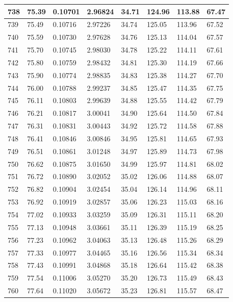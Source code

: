 \documentclass[12pt,a4paper,twoside]{article}
\begin{document}
\begin{center}
\begin{longtable}{l l l l | l l l l}
738 & 75.39 & 0.10701 & 2.96824 & 34.71 & 124.96 & 113.88 & 67.47 \\ \hline
739 & 75.49 & 0.10716 & 2.97226 & 34.74 & 125.05 & 113.96 & 67.52 \\ \hline
740 & 75.59 & 0.10730 & 2.97628 & 34.76 & 125.13 & 114.04 & 67.57 \\ \hline
741 & 75.70 & 0.10745 & 2.98030 & 34.78 & 125.22 & 114.11 & 67.61 \\ \hline
742 & 75.80 & 0.10759 & 2.98432 & 34.81 & 125.30 & 114.19 & 67.66 \\ \hline
743 & 75.90 & 0.10774 & 2.98835 & 34.83 & 125.38 & 114.27 & 67.70 \\ \hline
744 & 76.00 & 0.10788 & 2.99237 & 34.85 & 125.47 & 114.35 & 67.75 \\ \hline
745 & 76.11 & 0.10803 & 2.99639 & 34.88 & 125.55 & 114.42 & 67.79 \\ \hline
746 & 76.21 & 0.10817 & 3.00041 & 34.90 & 125.64 & 114.50 & 67.84 \\ \hline
747 & 76.31 & 0.10831 & 3.00443 & 34.92 & 125.72 & 114.58 & 67.88 \\ \hline
748 & 76.41 & 0.10846 & 3.00846 & 34.95 & 125.81 & 114.65 & 67.93 \\ \hline
749 & 76.51 & 0.10861 & 3.01248 & 34.97 & 125.89 & 114.73 & 67.98 \\ \hline
750 & 76.62 & 0.10875 & 3.01650 & 34.99 & 125.97 & 114.81 & 68.02 \\ \hline
751 & 76.72 & 0.10890 & 3.02052 & 35.02 & 126.06 & 114.88 & 68.07 \\ \hline
752 & 76.82 & 0.10904 & 3.02454 & 35.04 & 126.14 & 114.96 & 68.11 \\ \hline
753 & 76.92 & 0.10919 & 3.02857 & 35.06 & 126.23 & 115.03 & 68.16 \\ \hline
754 & 77.02 & 0.10933 & 3.03259 & 35.09 & 126.31 & 115.11 & 68.20 \\ \hline
755 & 77.13 & 0.10948 & 3.03661 & 35.11 & 126.39 & 115.19 & 68.25 \\ \hline
756 & 77.23 & 0.10962 & 3.04063 & 35.13 & 126.48 & 115.26 & 68.29 \\ \hline
757 & 77.33 & 0.10977 & 3.04465 & 35.16 & 126.56 & 115.34 & 68.34 \\ \hline
758 & 77.43 & 0.10991 & 3.04868 & 35.18 & 126.64 & 115.42 & 68.38 \\ \hline
759 & 77.54 & 0.11006 & 3.05270 & 35.20 & 126.73 & 115.49 & 68.43 \\ \hline
760 & 77.64 & 0.11020 & 3.05672 & 35.23 & 126.81 & 115.57 & 68.47 \\ \hline

\end{longtable}
\end{center}
\end{document}
